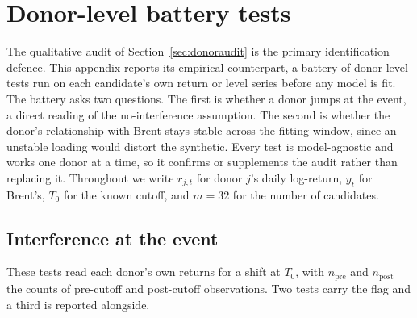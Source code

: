 \section{Donor-level battery tests}\label{app:breaks}
The qualitative audit of Section~\ref{sec:donoraudit} is the primary identification defence.
This appendix reports its empirical counterpart, a battery of donor-level tests run on each
candidate's own return or level series before any model is fit. The battery asks two
questions. The first is whether a donor jumps at the event, a direct reading of the
no-interference assumption. The second is whether the donor's relationship with Brent stays
stable across the fitting window, since an unstable loading would distort the synthetic.
Every test is model-agnostic and works one donor at a time, so it confirms or supplements the
audit rather than replacing it. Throughout we write $r_{j,t}$ for donor $j$'s daily log-return,
$y_t$ for Brent's, $T_0$ for the known cutoff, and $m=32$ for the number of candidates.

\subsection{Interference at the event}
These tests read each donor's own returns for a shift at $T_0$, with $n_{\text{pre}}$ and
$n_{\text{post}}$ the counts of pre-cutoff and post-cutoff observations. Two tests carry the
flag and a third is reported alongside.


